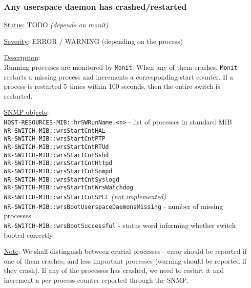 \subsubsection{\bf Any userspace daemon has crashed/restarted}
		\label{fail:other:daemon_crash}
		\begin{packed_enum}
			\item [] \underline{Status}: TODO \emph{(depends on monit)}
			\item [] \underline{Severity}: ERROR / WARNING (depending on the process)
			\item [] \underline{Description}:\\
				Running processes are monitored by \texttt{Monit}. When any of them
				crashes, \texttt{Monit} restarts a missing process and increments a
				corresponding start counter. If a process is restarted 5 times within
				100 seconds, then the entire switch is restarted.
			\item [] \underline{SNMP objects}:\\
				\texttt{HOST-RESOURCES-MIB::hrSWRunName.<n>} - list of processes in standard MIB\\
				\texttt{WR-SWITCH-MIB::wrsStartCntHAL}\\
				\texttt{WR-SWITCH-MIB::wrsStartCntPTP}\\
				\texttt{WR-SWITCH-MIB::wrsStartCntRTUd}\\
				\texttt{WR-SWITCH-MIB::wrsStartCntSshd}\\
				\texttt{WR-SWITCH-MIB::wrsStartCntHttpd}\\
				\texttt{WR-SWITCH-MIB::wrsStartCntSnmpd}\\
				\texttt{WR-SWITCH-MIB::wrsStartCntSyslogd}\\
				\texttt{WR-SWITCH-MIB::wrsStartCntWrsWatchdog}\\
				\texttt{WR-SWITCH-MIB::wrsStartCntSPLL} \emph{(not implemented)}\\
				\texttt{WR-SWITCH-MIB::wrsBootUserspaceDaemonsMissing} - number of missing processes\\
				\texttt{WR-SWITCH-MIB::wrsBootSuccessful} - status word informing whether switch booted correctly
			\item [] \underline{Note}: We shall distinguish between crucial
				processes - error should be reported if one of them crashes; and less
				important processes (warning should be reported if they crash). If any
				of the processes has crashed, we need to restart it and increment a
				per-process counter reported through the SNMP.


\end{packed_enum}
